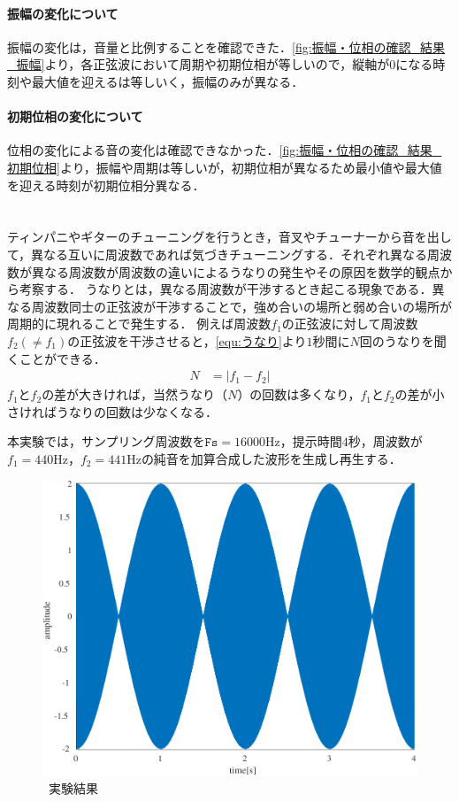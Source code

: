 \paragraph{振幅の変化について} 振幅の変化は，音量と比例することを確認できた．\ref{fig:振幅・位相の確認_結果_振幅}より，各正弦波において周期や初期位相が等しいので，縦軸が\(0\)になる時刻や最大値を迎えるは等しいく，振幅のみが異なる．
\paragraph{初期位相の変化について} 位相の変化による音の変化は確認できなかった．\ref{fig:振幅・位相の確認_結果_初期位相}より，振幅や周期は等しいが，初期位相が異なるため最小値や最大値を迎える時刻が初期位相分異なる．
\section{\kadaiac}\label{sec:\kadaiac}
\purpose
ティンパニやギターのチューニングを行うとき，音叉やチューナーから音を出して，異なる互いに周波数であれば気づきチューニングする．それぞれ異なる周波数が異なる周波数が周波数の違いによるうなりの発生やその原因を数学的観点から考察する．
\method
うなりとは，異なる周波数が干渉するとき起こる現象である．異なる周波数同士の正弦波が干渉することで，強め合いの場所と弱め合いの場所が周期的に現れることで発生する．
例えば周波数\(f_1\)の正弦波に対して周波数\(f_2(\neq f_1)\)の正弦波を干渉させると，\eqref{equ:うなり}より\(1\)秒間に\(N\)回のうなりを聞くことができる．
\begin{align}
    N & = \big|f_1-f_2\big|\label{equ:うなり}
\end{align}
\(f_1\)と\(f_2\)の差が大きければ，当然うなり（\(N\)）の回数は多くなり，\(f_1\)と\(f_2\)の差が小さければうなりの回数は少なくなる．\par
本実験では，サンプリング周波数を\(\texttt{Fs}=16000\textrm{Hz}\)，提示時間\(4\)秒，周波数が\(f_1=440\textrm{Hz}\)，\(f_2=441\textrm{Hz}\)の純音を加算合成した波形を生成し再生する．\par
\begin{figure}
    \centering
    \caption{\kadaiac\ 実験結果}
    \label{fig:\kadaiac_実験結果}
    \includegraphics[keepaspectratio,width=.3\textwidth]{../../Figures/01_03.pdf}
\end{figure}
